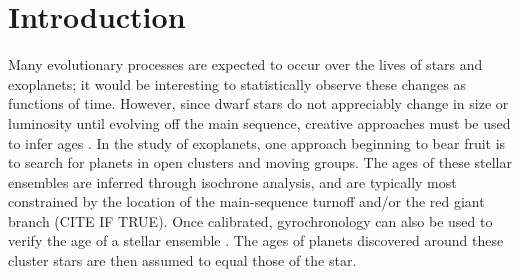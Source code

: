 \documentclass[12pt,twocolumn,tighten]{aastex62}
\begin{document}







\section{Introduction}
\label{sec:intro}

Many evolutionary processes are expected to occur over the lives of
stars and exoplanets; it would be interesting to statistically observe
these changes as functions of time.
However, since dwarf stars do not appreciably change in size or luminosity
until evolving off the main sequence, creative approaches must be used to
infer ages \citep{soderblom_ages_2010}.
In the study of exoplanets, one approach beginning to bear fruit
is to search for planets in open clusters and moving groups.
The ages of these stellar ensembles are inferred through isochrone
analysis, and are typically most constrained by the location of the
main-sequence turnoff and/or the red giant branch (CITE IF TRUE).
Once calibrated, gyrochronology can also be used to verify
the age of a stellar ensemble \citep[{\it
e.g.},][]{barnes_color-period_2015,meibom_spin-down_2015,curtis_tess_2019}.
The ages of planets discovered around these cluster stars are then
assumed to equal those of the star.
\end{document}
